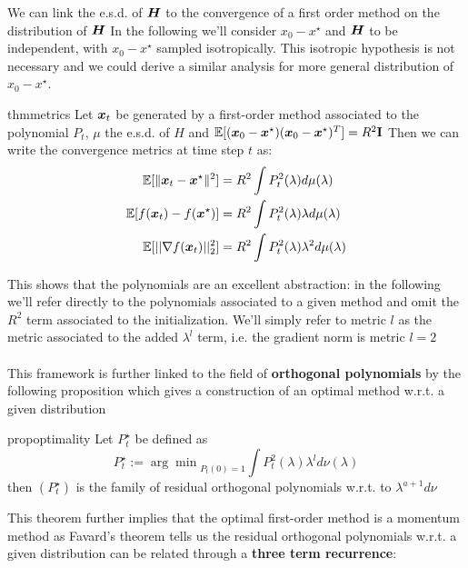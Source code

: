 \documentclass{article}
\begin{document}
We can link the e.s.d. of ${\boldsymbol H}$ to the convergence of a first order method on the distribution of ${\boldsymbol H}$ In the following we'll consider $x_0-x^\star$ and ${\boldsymbol H}$ to be independent, with $x_0-x^\star$ sampled isotropically. This isotropic hypothesis is not necessary and we could derive a similar analysis for  more general distribution  of $x_0-x^\star$.

\begin{restatable}{thm}{metrics} \label{thm: metrics}
Let ${\boldsymbol x}_t$ be generated by a first-order method associated to the polynomial $P_t$,  $\mu$ the  e.s.d. of $H$ and $\mathbb{E}[({\boldsymbol x}_0-{\boldsymbol x}^\star)({\boldsymbol x}_0-{\boldsymbol x}^\star)^T]=R^2\textbf{I}$ Then we can write the convergence metrics at time step  $t$ as:
\begin{align}\label{eq:error_norm_x}
  \mathbb{E}[\|{\boldsymbol x}_t-{\boldsymbol x}^\star\|^2] &= { R^2} \int {P_t^2(\lambda) d\mu(\lambda)} \\
    \mathbb{E}[f({\boldsymbol x}_t)-f({\boldsymbol x}^\star)]&=R^2\int P_t^2(\lambda)\lambda d\mu(\lambda)\\
    \mathbb{E}[||\nabla f({\boldsymbol x}_t)||^2_2]&=R^2\int P_t^2(\lambda)\lambda^2d\mu(\lambda) 
\end{align}
\end{restatable}
This shows that the polynomials are an excellent abstraction: in the following we'll refer directly to the polynomials associated to a given method and omit the $R^2$ term associated to the initialization. We'll simply refer to metric $l$ as the metric associated to the added $\lambda^l$ term, i.e. the gradient norm is metric $l=2$\\
\paragraph{}
This framework is further linked to the field of \textbf{orthogonal polynomials} by the following proposition which gives a construction of an optimal method w.r.t. a given distribution 
\begin{restatable}{prop}{optimality}\cite{pedregosa2020acceleration}
 \label{prop: optimality}
 Let $P_t^\star$ be defined as
 \begin{equation}
     P_t^\star:={\arg \min}_{P_t(0)=1} \int P_t^2(\lambda) \lambda^l d\nu(\lambda)
 \end{equation}
 then $(P_t^\star)$ is the family of residual orthogonal polynomials w.r.t. to $\lambda^{a+1}d\nu$
\end{restatable}

This theorem further implies that the  optimal first-order method is a momentum method as Favard's theorem \cite{marcellan2001favard} tells us the residual orthogonal polynomials w.r.t. a given distribution can be related through a \textbf{three term recurrence}:
\end{document}
